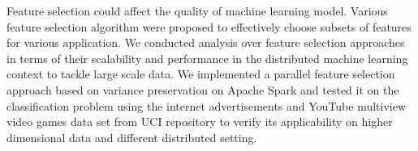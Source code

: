 % 
% 
%
Feature selection could affect the quality of machine learning model. Various feature selection algorithm were proposed to effectively choose subsets of features for various application. We conducted analysis over feature selection approaches in terms of their scalability and performance in the distributed machine learning context to tackle large scale data. We implemented a parallel feature selection approach based on variance preservation on Apache Spark and tested it on the classification problem using the internet advertisements and YouTube multiview video games data set from UCI repository to verify its applicability on higher dimensional data and different distributed setting.
